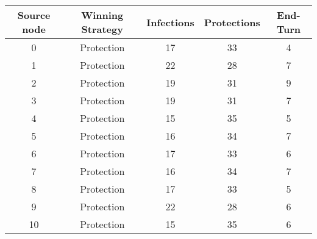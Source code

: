 \documentclass[results.tex]{subfiles}
\begin{document}
    \begin{center}
        \begin{tabular}{| c || c | c | c | c |}
            \hline
            {\bfseries Source node} & {\bfseries Winning Strategy} & {\bfseries Infections} & {\bfseries Protections}
            & {\bfseries End-Turn}
            \\  %
            \hline\hline
            0                       & Protection                   & 17                     & 33                      & 4                    \\
            \hline
            1                       & Protection                   & 22                     & 28                      & 7                    \\
            \hline
            2                       & Protection                   & 19                     & 31                      & 9                    \\
            \hline
            3                       & Protection                   & 19                     & 31                      & 7                    \\
            \hline
            4                       & Protection                   & 15                     & 35                      & 5                    \\
            \hline
            5                       & Protection                   & 16                     & 34                      & 7                    \\
            \hline
            6                       & Protection                   & 17                     & 33                      & 6                    \\
            \hline
            7                       & Protection                   & 16                     & 34                      & 7                    \\
            \hline
            8                       & Protection                   & 17                     & 33                      & 5                    \\
            \hline
            9                       & Protection                   & 22                     & 28                      & 6                    \\
            \hline
            10                      & Protection                   & 15                     & 35                      & 6                    \\

\end{tabular}
\end{center}
\end{document}
